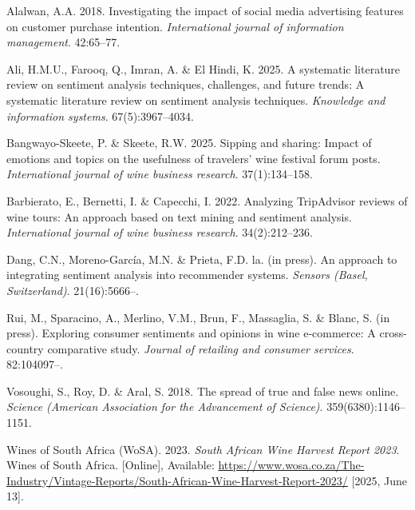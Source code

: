 \documentclass[11pt,preprint]{elsarticle}
\numberwithin{equation}{section}
\numberwithin{figure}{section}
\numberwithin{table}{section}
\newlength{\cslhangindent}
\newenvironment{CSLReferences}[2] %
{\begin{list}{}{%
	\setlength{\itemindent}{0pt}
	\setlength{\leftmargin}{0pt}
	\setlength{\parsep}{0pt}
	\ifodd #1
	\setlength{\leftmargin}{\cslhangindent}
	\setlength{\itemindent}{-1\cslhangindent}
	\fi
	\setlength{\itemsep}{#2\baselineskip}}}
{\end{list}}
\begin{document}
\label{refs}
\begin{CSLReferences}{1}{1}
Alalwan, A.A. 2018. Investigating the impact of social media advertising
features on customer purchase intention. \emph{International journal of
information management}. 42:65--77.

Ali, H.M.U., Farooq, Q., Imran, A. \& El Hindi, K. 2025. A systematic
literature review on sentiment analysis techniques, challenges, and
future trends: A systematic literature review on sentiment analysis
techniques. \emph{Knowledge and information systems}. 67(5):3967--4034.

Bangwayo-Skeete, P. \& Skeete, R.W. 2025. Sipping and sharing: Impact of
emotions and topics on the usefulness of travelers' wine festival forum
posts. \emph{International journal of wine business research}.
37(1):134--158.

Barbierato, E., Bernetti, I. \& Capecchi, I. 2022. Analyzing TripAdvisor
reviews of wine tours: An approach based on text mining and sentiment
analysis. \emph{International journal of wine business research}.
34(2):212--236.

Dang, C.N., Moreno-García, M.N. \& Prieta, F.D. la. (in press). An
approach to integrating sentiment analysis into recommender systems.
\emph{Sensors (Basel, Switzerland)}. 21(16):5666--.

Rui, M., Sparacino, A., Merlino, V.M., Brun, F., Massaglia, S. \& Blanc,
S. (in press). Exploring consumer sentiments and opinions in wine
e-commerce: A cross-country comparative study. \emph{Journal of
retailing and consumer services}. 82:104097--.

Vosoughi, S., Roy, D. \& Aral, S. 2018. The spread of true and false
news online. \emph{Science (American Association for the Advancement of
Science)}. 359(6380):1146--1151.

Wines of South Africa (WoSA). 2023. \emph{South {A}frican {W}ine
{H}arvest {R}eport 2023}. Wines of South Africa. {[}Online{]},
Available:
\url{https://www.wosa.co.za/The-Industry/Vintage-Reports/South-African-Wine-Harvest-Report-2023/}
{[}2025, June 13{]}.

\end{CSLReferences}


\end{document}

